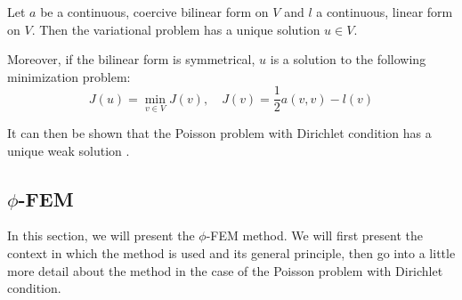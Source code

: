 \begin{Prop}
	
	Let $a$ be a continuous, coercive bilinear form on $V$ and $l$ a continuous, linear form on $V$. Then the variational problem has a unique solution $u\in V$. 
	
	Moreover, if the bilinear form is symmetrical, $u$ is a solution to the following minimization problem:
	\begin{equation*}
		J(u)=\min_{v\in V} J(v), \quad J(v)=\frac{1}{2}a(v,v)-l(v)
	\end{equation*}
\end{Prop}

It can then be shown that the Poisson problem with Dirichlet condition has a unique weak solution .





\subsection{$\phi$-FEM}

In this section, we will present the $\phi$-FEM method. We will first present the context in which the method is used and its general principle, then go into a little more detail about the method in the case of the Poisson problem with Dirichlet condition. 



